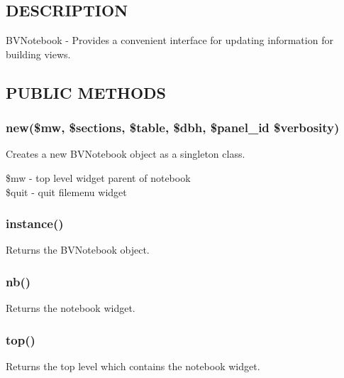 \documentclass{article}
\begin{document}
\subsection*{DESCRIPTION\label{BVNotebook_DESCRIPTION}}


BVNotebook - Provides a convenient interface for updating information for
building views.

\subsection*{PUBLIC METHODS\label{BVNotebook_PUBLIC_METHODS}}
\subsubsection*{new(\$mw, \$sections, \$table, \$dbh, \$panel\_id \$verbosity)\label{BVNotebook_new_mw_sections_table_dbh_panel_id_verbosity_}}


Creates a new BVNotebook object as a singleton class.

\begin{description}

\item[{\$mw - top level widget parent of notebook}] \mbox{}
\item[{\$quit - quit filemenu widget}] \mbox{}\end{description}
\subsubsection*{instance()\label{BVNotebook_instance_}}


Returns the BVNotebook object.

\subsubsection*{nb()\label{BVNotebook_nb_}}


Returns the notebook widget.

\subsubsection*{top()\label{BVNotebook_top_}}


Returns the top level which contains the notebook widget.
\end{document}
